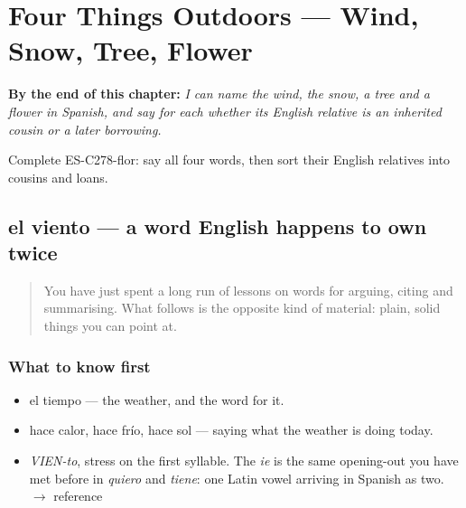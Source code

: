 
\chapter{Four Things Outdoors --- Wind, Snow, Tree, Flower}
\label{ch:al-aire-libre}

\begin{chapteropening}
\textbf{By the end of this chapter:} \emph{I can name the wind, the snow, a tree and a flower in Spanish, and say for each whether its English relative is an inherited cousin or a later borrowing.}

Complete ES-C278-flor: say all four words, then sort their English relatives into cousins and loans.
\end{chapteropening}

\section[el viento]{el viento — a word English happens to own twice}

\label{lesson:ES-C278-viento}



\begin{quote}
You have just spent a long run of lessons on words for arguing, citing and summarising. What follows is the opposite kind of material: plain, solid things you can point at.
\end{quote}

\subsection*{What to know first}
\begin{itemize}
\raggedright
  \item el tiempo — the weather, and the word for it.
  \item hace calor, hace frío, hace sol — saying what the weather is doing today.
\end{itemize}

\begin{sounds}
\begin{itemize}
\raggedright
  \item \emph{VIEN-to}, stress on the first syllable. The \emph{ie} is the same opening-out you have met before in \emph{quiero} and \emph{tiene}: one Latin vowel arriving in Spanish as two. $\to$ reference
\end{itemize}
\end{sounds}

